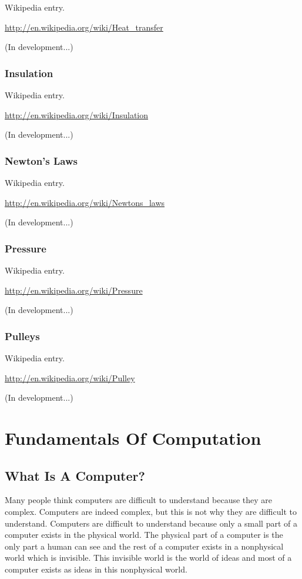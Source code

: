 \documentclass[12pt,oneside]{book}
\begin{document}
Wikipedia entry.

\href{http://en.wikipedia.org/wiki/Heat_transfer}{http://en.wikipedia.org/wiki/Heat\_transfer}

(In development...)

\subsection[Insulation]{Insulation}

Wikipedia entry.

\href{http://en.wikipedia.org/wiki/Insulation}{http://en.wikipedia.org/wiki/Insulation}

(In development...)

\subsection[Newton's Laws]{ Newton's Laws}

Wikipedia entry.

\href{http://en.wikipedia.org/wiki/Newtons_laws}{http://en.wikipedia.org/wiki/Newtons\_laws}

(In development...)

\subsection[Pressure]{Pressure}

Wikipedia entry.

\href{http://en.wikipedia.org/wiki/Pressure}{http://en.wikipedia.org/wiki/Pressure}

(In development...)

\subsection[Pulleys]{Pulleys}

Wikipedia entry.

\href{http://en.wikipedia.org/wiki/Pulley}{http://en.wikipedia.org/wiki/Pulley}

(In development...)
\chapter{Fundamentals Of Computation} \section[What Is A Computer?]{What Is A Computer?}

Many people think computers are difficult to understand because they are complex. Computers are indeed complex, but this is not why they are difficult to understand. Computers are difficult to understand because only a small part of a computer exists in the physical world. The physical part of a computer is the only part a human can see and the rest of a computer exists in a nonphysical world which is invisible. This invisible world is the world of ideas and most of a computer exists as ideas in this nonphysical world. 
\end{document}
